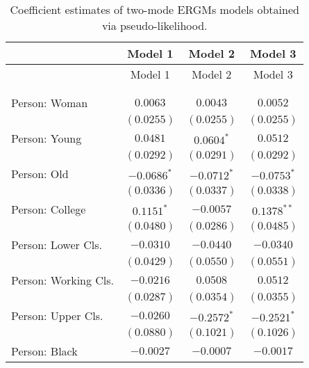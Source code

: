 
\begin{center}
\begin{longtable}{l c c c}
\toprule
 & Model 1 & Model 2 & Model 3 \\
\midrule
\endfirsthead
\toprule
 & Model 1 & Model 2 & Model 3 \\
\midrule
\endhead
\bottomrule
\endfoot
\bottomrule
\multicolumn{4}{l}{\scriptsize{$^{***}p<0.001$; $^{**}p<0.01$; $^{*}p<0.05$}}\\
\caption{Coefficient estimates of two-mode ERGMs models obtained via pseudo-likelihood.}
\label{tab:reg3}
\endlastfoot \\
Person: Woman                             & $0.0063$        & $0.0043$       & $0.0052$        \\
                                          & $(0.0255)$      & $(0.0255)$     & $(0.0255)$      \\
Person: Young                             & $0.0481$        & $0.0604^{*}$   & $0.0512$        \\
                                          & $(0.0292)$      & $(0.0291)$     & $(0.0292)$      \\
Person: Old                               & $-0.0686^{*}$   & $-0.0712^{*}$  & $-0.0753^{*}$   \\
                                          & $(0.0336)$      & $(0.0337)$     & $(0.0338)$      \\
Person: College                           & $0.1151^{*}$    & $-0.0057$      & $0.1378^{**}$   \\
                                          & $(0.0480)$      & $(0.0286)$     & $(0.0485)$      \\
Person: Lower Cls.                        & $-0.0310$       & $-0.0440$      & $-0.0340$       \\
                                          & $(0.0429)$      & $(0.0550)$     & $(0.0551)$      \\
Person: Working Cls.                      & $-0.0216$       & $0.0508$       & $0.0512$        \\
                                          & $(0.0287)$      & $(0.0354)$     & $(0.0355)$      \\
Person: Upper Cls.                        & $-0.0260$       & $-0.2572^{*}$  & $-0.2521^{*}$   \\
                                          & $(0.0880)$      & $(0.1021)$     & $(0.1026)$      \\
Person: Black                             & $-0.0027$       & $-0.0007$      & $-0.0017$       \\

\end{longtable}
\end{center}

